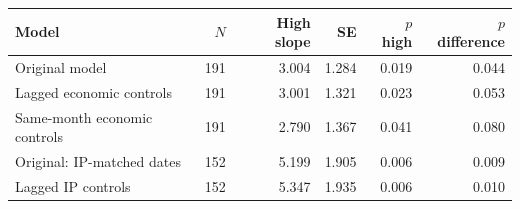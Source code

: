 \begin{tabular}{@{}lrrrrr@{}}
\toprule
Model & $N$ & High slope & SE & $p$ high & $p$ difference \\
\midrule
Original model & 191 & 3.004 & 1.284 & 0.019 & 0.044 \\
Lagged economic controls & 191 & 3.001 & 1.321 & 0.023 & 0.053 \\
Same-month economic controls & 191 & 2.790 & 1.367 & 0.041 & 0.080 \\
Original: IP-matched dates & 152 & 5.199 & 1.905 & 0.006 & 0.009 \\
Lagged IP controls & 152 & 5.347 & 1.935 & 0.006 & 0.010 \\
\bottomrule
\end{tabular}